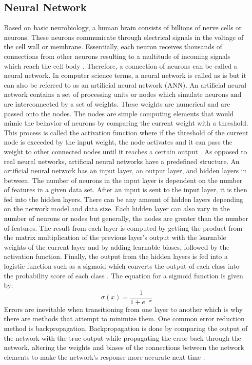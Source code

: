 \documentclass[journal]{./IEEE/IEEEtran}
\begin{document}
\subsection{Neural Network}
Based on basic neurobiology, a human brain consists of billions of nerve cells or neurons. These neurons communicate through electrical signals in the voltage of the cell wall or membrane. Essentially, each neuron receives thousands of connections from other neurons resulting to a multitude of incoming signals which reach the cell body \cite{Gurney1997}. Therefore, a connection of neurons can be called a neural network. In computer science terms, a neural network is called as is but it can also be referred to as an artificial neural network (ANN).
\newline
\indent An artificial neural network contains a set of processing units or nodes which simulate neurons and are interconnected by a set of weights. These weights are numerical and are passed onto the nodes. The nodes are simple computing elements that would mimic the behavior of neurons by comparing the current weight with a threshold. This process is called the activation function where if the threshold of the current node is exceeded by the input weight, the node activates and it can pass the weight to other connected nodes until it reaches a certain output \cite{Cross1995}.
\newline
\indent As opposed to real neural networks, artificial neural networks have a predefined structure. An artificial neural network has an input layer, an output layer, and hidden layers in between. The number of neurons in the input layer is dependent on the number of features in a given data set. After an input is sent to the input layer, it is then fed into the hidden layers. There can be any amount of hidden layers depending on the network model and data size. Each hidden layer can also vary in the number of neurons or nodes but generally, the nodes are greater than the number of features. The result from each layer is computed by getting the product from the matrix multiplication of the previous layer's output with the learnable weights of the current layer and by adding learnable biases, followed by the activation function. Finally, the output from the hidden layers is fed into a logistic function such as a sigmoid which converts the output of each class into the probability score of each class \cite{MishraND}. The equation for a sigmoid function is given by:
\newline
\begin{equation}
\sigma(x) = \frac{1}{1+e^{-x}}
\end{equation}
\newline
\indent Errors are inevitable when transitioning from one layer to another which is why there are methods that attempt to minimize them. One common error reduction method is backpropagation. Backpropagation is done by comparing the output of the network with the true output while propagating the error back through the network, altering the weights and biases of the connections between the network elements to make the network's response more accurate next time \cite{Cross1995}.
\end{document}
